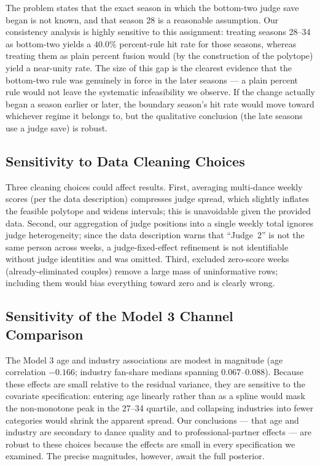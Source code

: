 \documentclass{article}
\begin{document}
The problem states that the exact season in which the bottom-two judge save began is not
known, and that season 28 is a reasonable assumption. Our consistency analysis is highly
sensitive to this assignment: treating seasons 28--34 as bottom-two yields a $40.0\%$ percent-rule
hit rate for those seasons, whereas treating them as plain percent fusion would (by the
construction of the polytope) yield a near-unity rate. The size of this gap is the clearest
evidence that the bottom-two rule was genuinely in force in the later seasons --- a plain
percent rule would not leave the systematic infeasibility we observe. If the change actually
began a season earlier or later, the boundary season's hit rate would move toward whichever
regime it belongs to, but the qualitative conclusion (the late seasons use a judge save) is
robust.

\subsection{Sensitivity to Data Cleaning Choices}

Three cleaning choices could affect results. First, averaging multi-dance weekly scores
(per the data description) compresses judge spread, which slightly inflates the feasible
polytope and widens intervals; this is unavoidable given the provided data. Second, our
aggregation of judge positions into a single weekly total ignores judge heterogeneity; since
the data description warns that ``Judge~2'' is not the same person across weeks, a
judge-fixed-effect refinement is not identifiable without judge identities and was omitted.
Third, excluded zero-score weeks (already-eliminated couples) remove a large mass of
uninformative rows; including them would bias everything toward zero and is clearly wrong.

\subsection{Sensitivity of the Model 3 Channel Comparison}

The Model 3 age and industry associations are modest in magnitude (age correlation
$-0.166$; industry fan-share medians spanning $0.067$--$0.088$). Because these effects are
small relative to the residual variance, they are sensitive to the covariate specification:
entering age linearly rather than as a spline would mask the non-monotone peak in the
27--34 quartile, and collapsing industries into fewer categories would shrink the apparent
spread. Our conclusions --- that age and industry are secondary to dance quality and to
professional-partner effects --- are robust to these choices because the effects are small in
every specification we examined. The precise magnitudes, however, await the full posterior.
\end{document}
